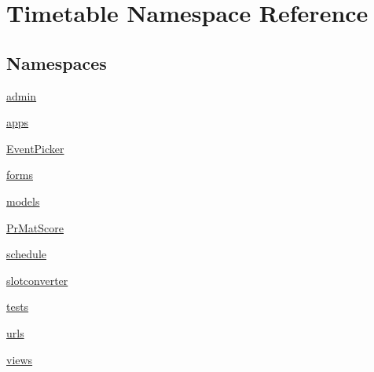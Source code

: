 \hypertarget{namespaceTimetable}{}\section{Timetable Namespace Reference}
\label{namespaceTimetable}
\subsection*{Namespaces}
\begin{DoxyCompactItemize}
\item 
 \hyperlink{namespaceTimetable_1_1admin}{admin}
\item 
 \hyperlink{namespaceTimetable_1_1apps}{apps}
\item 
 \hyperlink{namespaceTimetable_1_1EventPicker}{Event\+Picker}
\item 
 \hyperlink{namespaceTimetable_1_1forms}{forms}
\item 
 \hyperlink{namespaceTimetable_1_1models}{models}
\item 
 \hyperlink{namespaceTimetable_1_1PrMatScore}{Pr\+Mat\+Score}
\item 
 \hyperlink{namespaceTimetable_1_1schedule}{schedule}
\item 
 \hyperlink{namespaceTimetable_1_1slotconverter}{slotconverter}
\item 
 \hyperlink{namespaceTimetable_1_1tests}{tests}
\item 
 \hyperlink{namespaceTimetable_1_1urls}{urls}
\item 
 \hyperlink{namespaceTimetable_1_1views}{views}
\end{DoxyCompactItemize}
